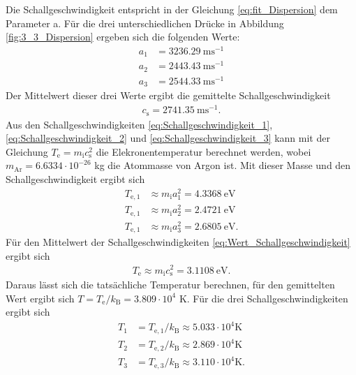 Die Schallgeschwindigkeit entspricht in der Gleichung \eqref{eq:fit_Dispersion} dem Parameter a. Für die drei unterschiedlichen Drücke in Abbildung \ref{fig:3_3_Dispersion} ergeben sich die folgenden Werte:
\begin{align}
  a_1 & = 3236.29\  \mathrm{m s}^{-1} \label{eq:Schallgeschwindigkeit_1} \\
  a_2 & = 2443.43\  \mathrm{m s}^{-1}  \label{eq:Schallgeschwindigkeit_2}\\
  a_3 & = 2544.33\  \mathrm{m s}^{-1}
  \label{eq:Schallgeschwindigkeit_3}
\end{align}
Der Mittelwert dieser drei Werte ergibt die gemittelte Schallgeschwindigkeit
\begin{align}
  c_{\mathrm{s}}= 2741.35\  \mathrm{m s}^{-1}.
  \label{eq:Wert_Schallgeschwindigkeit}
\end{align}
Aus den Schallgeschwindigkeiten \eqref{eq:Schallgeschwindigkeit_1}, \eqref{eq:Schallgeschwindigkeit_2} und \eqref{eq:Schallgeschwindigkeit_3} kann mit der Gleichung $ T_{\mathrm{e}} = m_{\mathrm{i}} c_{\mathrm{s}}^2$ die Elekronentemperatur berechnet werden, wobei $ m_{\mathrm{Ar}}=6.6334 \cdot 10^{-26}$ kg \cite{wiki:Argon}  die Atommasse von Argon  ist. Mit dieser Masse und den Schallgeschwindigkeit  ergibt sich
\begin{align}
  T_{\mathrm{e},1} &\approx m_{\mathrm{i}} a_{\mathrm{1}}^2 = 4.3368\ \mathrm{eV}\\
  T_{\mathrm{e},1} &\approx m_{\mathrm{i}} a_{\mathrm{2}}^2 = 2.4721\ \mathrm{eV}\\
  T_{\mathrm{e},1} &\approx m_{\mathrm{i}} a_{\mathrm{3}}^2 = 2.6805\ \mathrm{eV}.
\end{align}
Für den Mittelwert der Schallgeschwindigkeiten \eqref{eq:Wert_Schallgeschwindigkeit} ergibt sich
\begin{align}
   T_{\mathrm{e}} \approx m_{\mathrm{i}} c_{\mathrm{s}}^2= 3.1108\ \mathrm{eV}.
  \end{align} 
Daraus lässt sich die tatsächliche Temperatur berechnen, für den gemittelten Wert ergibt sich $T=T_{\mathrm{e}}/k_{\mathrm{B}}=3.809 \cdot 10^4$ K. Für die drei Schallgeschwindigkeiten ergibt sich
\begin{align}
T_1 &= T_{\mathrm{e},1}/k_{\mathrm{B}} \approx 5.033 \cdot 10^4 \mathrm{K} \\
T_2 &= T_{\mathrm{e},2}/k_{\mathrm{B}} \approx 2.869 \cdot 10^4 \mathrm{K} \\
T_3 &= T_{\mathrm{e},3}/k_{\mathrm{B}} \approx 3.110 \cdot 10^4 \mathrm{K}.
\end{align}
